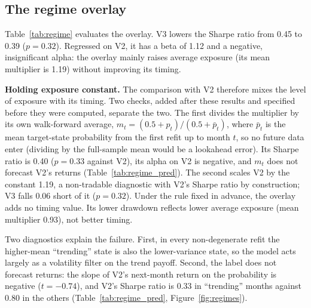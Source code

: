 \documentclass[11pt,a4paper]{article}
\newcommand{\tabfit}[1]{\resizebox{\textwidth}{!}{}}
\begin{document}
\subsection{The regime overlay}
\label{sec:regime_results}

Table~\ref{tab:regime} evaluates the overlay. V3 lowers the Sharpe ratio from 0.45 to 0.39 ($p = 0.32$). Regressed on V2, it has a beta of 1.12 and a negative, insignificant alpha: the overlay mainly raises average exposure (its mean multiplier is 1.19) without improving its timing.

\textbf{Holding exposure constant.} The comparison with V2 therefore mixes the level of exposure with its timing. Two checks, added after these results and specified before they were computed, separate the two. The first divides the multiplier by its own walk-forward average, $m_t = (0.5 + p_t)/(0.5 + \bar p_t)$, where $\bar p_t$ is the mean target-state probability from the first refit up to month $t$, so no future data enter (dividing by the full-sample mean would be a lookahead error). Its Sharpe ratio is 0.40 ($p = 0.33$ against V2), its alpha on V2 is negative, and $m_t$ does not forecast V2's returns (Table~\ref{tab:regime_pred}). The second scales V2 by the constant 1.19, a non-tradable diagnostic with V2's Sharpe ratio by construction; V3 falls 0.06 short of it ($p = 0.32$). Under the rule fixed in advance, the overlay adds no timing value. Its lower drawdown reflects lower average exposure (mean multiplier 0.93), not better timing.

\begin{table}[!htbp]
\centering
\caption{Regime-conditioned exposure. $\Delta$SR and $p$: Sharpe difference from V2 and bootstrap $p$-value. $\alpha$ on V2: annualised alpha (\%) from regressing the overlay on V2, Newey-West $t$. V3 normalised divides the V3 multiplier by its walk-forward mean. $^\ddagger$Scales V2 by V3's realised mean multiplier, which uses full-sample information: a diagnostic, not a tradable strategy, with V2's Sharpe ratio by construction, so no test is reported. $^\dagger$Lookahead illustrations use a single full-sample fit and therefore future data; they are not results. Other overlay variants are in Table~\ref{tab:regimeextra}.}
\label{tab:regime}
\small
\tabfit{tables/tab08_regime}
\end{table}

Two diagnostics explain the failure. First, in every non-degenerate refit the higher-mean ``trending'' state is also the lower-variance state, so the model acts largely as a volatility filter on the trend payoff. Second, the label does not forecast returns: the slope of V2's next-month return on the probability is negative ($t = -0.74$), and V2's Sharpe ratio is 0.33 in ``trending'' months against 0.80 in the others (Table~\ref{tab:regime_pred}, Figure~\ref{fig:regimes}).
\end{document}
